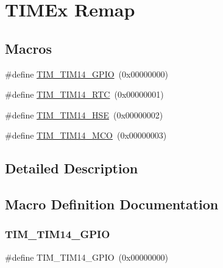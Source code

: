 \hypertarget{group___t_i_m_ex___remap}{}\section{T\+I\+M\+Ex Remap}
\label{group___t_i_m_ex___remap}
\subsection*{Macros}
\begin{DoxyCompactItemize}
\item 
\#define \hyperlink{group___t_i_m_ex___remap_ga3e193fef93c009df96accc1fe6e42b1d}{T\+I\+M\+\_\+\+T\+I\+M14\+\_\+\+G\+P\+IO}~(0x00000000)
\item 
\#define \hyperlink{group___t_i_m_ex___remap_ga6a5e15109b6683b7ea64dcd9a807a365}{T\+I\+M\+\_\+\+T\+I\+M14\+\_\+\+R\+TC}~(0x00000001)
\item 
\#define \hyperlink{group___t_i_m_ex___remap_ga9212c5f6376bd3c71c2884a26e19aa9b}{T\+I\+M\+\_\+\+T\+I\+M14\+\_\+\+H\+SE}~(0x00000002)
\item 
\#define \hyperlink{group___t_i_m_ex___remap_gad90fa8f80dd93fc0f3c6493a8c97a08f}{T\+I\+M\+\_\+\+T\+I\+M14\+\_\+\+M\+CO}~(0x00000003)
\end{DoxyCompactItemize}


\subsection{Detailed Description}


\subsection{Macro Definition Documentation}
\mbox{\label{group___t_i_m_ex___remap_ga3e193fef93c009df96accc1fe6e42b1d}} 
\subsubsection{\texorpdfstring{T\+I\+M\+\_\+\+T\+I\+M14\+\_\+\+G\+P\+IO}{TIM\_TIM14\_GPIO}}
{\footnotesize\ttfamily \#define T\+I\+M\+\_\+\+T\+I\+M14\+\_\+\+G\+P\+IO~(0x00000000)}


